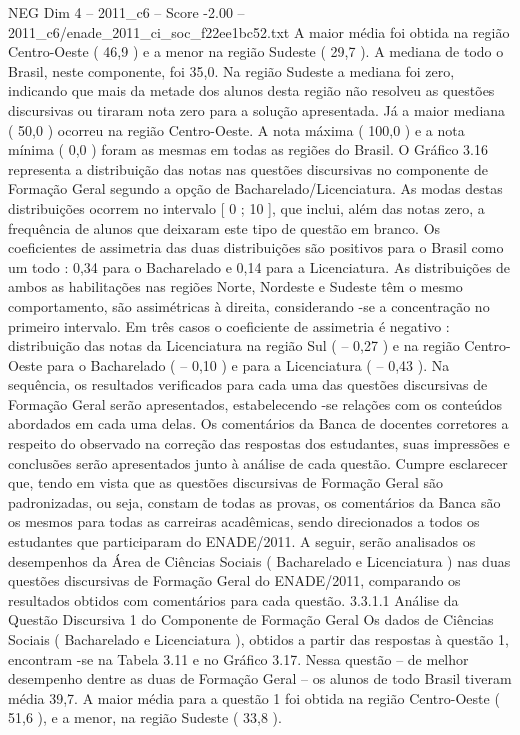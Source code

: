 \begin{textsample}{NEG Dim 4 – 2011\_c6 – Score -2.00 – 2011\_c6/enade\_2011\_ci\_soc\_f22ee1bc52.txt}
A maior média foi obtida na região Centro-Oeste ( 46,9 ) e a menor na região Sudeste ( 29,7 ).
A mediana de todo o Brasil, neste componente, foi 35,0.
Na região Sudeste a mediana foi zero, indicando que mais da metade dos alunos desta região não resolveu as questões discursivas ou tiraram nota zero para a solução apresentada.
Já a maior mediana ( 50,0 ) ocorreu na região Centro-Oeste.
A nota máxima ( 100,0 ) e a nota mínima ( 0,0 ) foram as mesmas em todas as regiões do Brasil.
O Gráfico 3.16 representa a distribuição das notas nas questões discursivas no componente de Formação Geral segundo a opção de Bacharelado/Licenciatura.
As modas destas distribuições ocorrem no intervalo [ 0 ; 10 ], que inclui, além das notas zero, a frequência de alunos que deixaram este tipo de questão em branco.
Os coeficientes de assimetria das duas distribuições são positivos para o Brasil como um todo : 0,34 para o Bacharelado e 0,14 para a Licenciatura.
As distribuições de ambos as habilitações nas regiões Norte, Nordeste e Sudeste têm o mesmo comportamento, são assimétricas à direita, considerando -se a concentração no primeiro intervalo.
Em três casos o coeficiente de assimetria é negativo : distribuição das notas da Licenciatura na região Sul ( – 0,27 ) e na região Centro-Oeste para o Bacharelado ( – 0,10 ) e para a Licenciatura ( – 0,43 ).
Na sequência, os resultados verificados para cada uma das questões discursivas de Formação Geral serão apresentados, estabelecendo -se relações com os conteúdos abordados em cada uma delas.
Os comentários da Banca de docentes corretores a respeito do observado na correção das respostas dos estudantes, suas impressões e conclusões serão apresentados junto à análise de cada questão.
Cumpre esclarecer que, tendo em vista que as questões discursivas de Formação Geral são padronizadas, ou seja, constam de todas as provas, os comentários da Banca são os mesmos para todas as carreiras acadêmicas, sendo direcionados a todos os estudantes que participaram do ENADE/2011.
A seguir, serão analisados os desempenhos da Área de Ciências Sociais ( Bacharelado e Licenciatura ) nas duas questões discursivas de Formação Geral do ENADE/2011, comparando os resultados obtidos com comentários para cada questão. 3.3.1.1 Análise da Questão Discursiva 1 do Componente de Formação Geral Os dados de Ciências Sociais ( Bacharelado e Licenciatura ), obtidos a partir das respostas à questão 1, encontram -se na Tabela 3.11 e no Gráfico 3.17.
Nessa questão – de melhor desempenho dentre as duas de Formação Geral – os alunos de todo Brasil tiveram média 39,7.
A maior média para a questão 1 foi obtida na região Centro-Oeste ( 51,6 ), e a menor, na região Sudeste ( 33,8 ).

\end{textsample}
